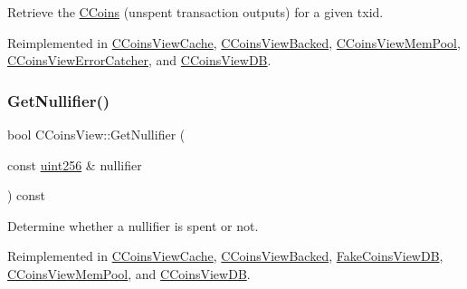 Retrieve the \mbox{\hyperlink{class_c_coins}{C\+Coins}} (unspent transaction outputs) for a given txid. 



Reimplemented in \mbox{\hyperlink{class_c_coins_view_cache_a1b62444593fdb580bfa4bd6fab41fafa}{C\+Coins\+View\+Cache}}, \mbox{\hyperlink{class_c_coins_view_backed_a456f9e85817556329a959c120998df5b}{C\+Coins\+View\+Backed}}, \mbox{\hyperlink{class_c_coins_view_mem_pool_a1a4a556821b1680ff4b73758c8a1e471}{C\+Coins\+View\+Mem\+Pool}}, \mbox{\hyperlink{class_c_coins_view_error_catcher_a909f7b9e364b6f06bfea955209aa015d}{C\+Coins\+View\+Error\+Catcher}}, and \mbox{\hyperlink{class_c_coins_view_d_b_ac35a80d1115ec697101d382e71db5b31}{C\+Coins\+View\+DB}}.

\mbox{\label{class_c_coins_view_a45a7abe02d0d9d1b61a09dec70a3311f}} 
\subsubsection{\texorpdfstring{Get\+Nullifier()}{GetNullifier()}}
{\footnotesize\ttfamily bool C\+Coins\+View\+::\+Get\+Nullifier (\begin{DoxyParamCaption}\item[{const \mbox{\hyperlink{classuint256}{uint256}} \&}]{nullifier }\end{DoxyParamCaption}) const\hspace{0.3cm}{\ttfamily [virtual]}}



Determine whether a nullifier is spent or not. 



Reimplemented in \mbox{\hyperlink{class_c_coins_view_cache_a72dd0d15434f85d518f23a278e813a03}{C\+Coins\+View\+Cache}}, \mbox{\hyperlink{class_c_coins_view_backed_afbfee79b18b475d67cd757a7dc4f5955}{C\+Coins\+View\+Backed}}, \mbox{\hyperlink{class_fake_coins_view_d_b_af7d0ce4926fb03ee632148c5fde66c05}{Fake\+Coins\+View\+DB}}, \mbox{\hyperlink{class_c_coins_view_mem_pool_ac76524f89eb1a8c25e3c6c3201d3662a}{C\+Coins\+View\+Mem\+Pool}}, and \mbox{\hyperlink{class_c_coins_view_d_b_ac9724829164f5a06b6d7c610da03a730}{C\+Coins\+View\+DB}}.

\mbox{\label{class_c_coins_view_adbd7f73ba071c6e441dd88d95b8f2c0d}} 
